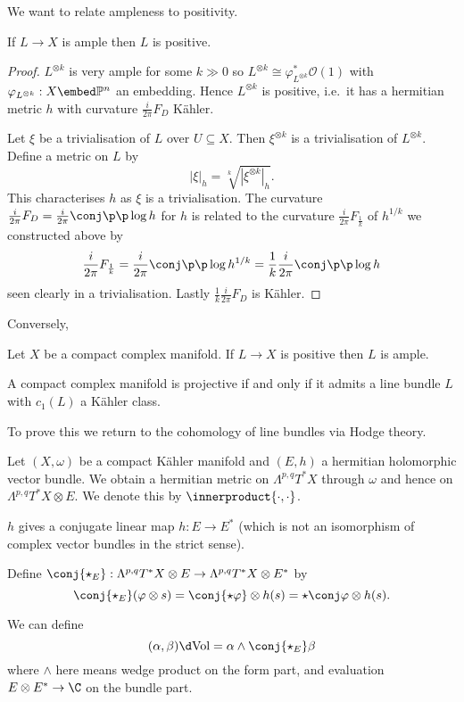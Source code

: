 \documentclass[a4paper]{article}
\renewcommand{\P}{\mathbb P} %
\newcommand{\w}{\wedge} %
\newcommand*{\ip}{\innerproduct}
\begin{document}
We want to relate ampleness to positivity.
\begin{lemma}
  If \(L \to X\) is ample then \(L\) is positive.
\end{lemma}

\begin{proof}
  \(L^{\otimes k}\) is very ample for some \(k \gg 0\) so \(L^{\otimes k} \cong \varphi_{L^{\otimes k}}^* \mathcal O(1)\) with \(\varphi_{L^{\otimes k}}: X \embed \P^n\) an embedding. Hence \(L^{\otimes k}\) is positive, i.e.\ it has a hermitian metric \(h\) with curvature \(\frac{i}{2\pi} F_D\) Kähler.

  Let \(\xi\) be a trivialisation of \(L\) over \(U \subseteq X\). Then \(\xi^{\otimes k}\) is a trivialisation of \(L^{\otimes k}\). Define a metric on \(L\) by
  \[
    |\xi|_h = \sqrt[k]{|\xi^{\otimes k}|_h}.
  \]
  This characterises \(h\) as \(\xi\) is a trivialisation. The curvature \(\frac{i}{2\pi} F_D = \frac{i}{2\pi} \conj \p \p \log h\) for \(h\) is related to the curvature \(\frac{i}{2\pi} F_{\frac{1}{k}}\) of \(h^{1/k}\) we constructed above by
  \[
    \frac{i}{2\pi} F_{\frac{1}{k}}
    = \frac{i}{2\pi} \conj \p \p \log h^{1/k}
    = \frac{1}{k} \frac{i}{2\pi} \conj \p \p \log h
  \]
  seen clearly in a trivialisation. Lastly \(\frac{1}{k} \frac{i}{2\pi} F_D\) is Kähler.
\end{proof}

Conversely,
\begin{theorem}
  Let \(X\) be a compact complex manifold. If \(L \to X\) is positive then \(L\) is ample.
\end{theorem}

\begin{corollary}
  A compact complex manifold is projective if and only if it admits a line bundle \(L\) with \(c_1(L)\) a Kähler class.
\end{corollary}
To prove this we return to the cohomology of line bundles via Hodge theory.

Let \((X, \omega)\) be a compact Kähler manifold and \((E, h)\) a hermitian holomorphic vector bundle. We obtain a hermitian metric on \(\Lambda^{p, q} T^*X\) through \(\omega\) and hence on \(\Lambda^{p, q}T^*X \otimes E\). We denote this by \(\ip{\cdot, \cdot}\).

\(h\) gives a conjugate linear map \(h: E \to E^*\) (which is not an isomorphism of complex vector bundles in the strict sense).

\begin{definition}
  Define \(\conj{\star_E}: \Lambda^{p, q}T^*X \otimes E \to \Lambda^{p, q}T^*X \otimes E^*\) by
  \[
    \conj{\star_E}(\varphi \otimes s)
    = \conj{\star \varphi} \otimes h(s)
    = \star \conj \varphi \otimes h(s).
  \]
\end{definition}
We can define
\[
  (\alpha, \beta) \d \text{Vol} = \alpha \w \conj{\star_E} \beta
\]
where \(\w\) here means wedge product on the form part, and evaluation \(E \otimes E^* \to \C\) on the bundle part.
\end{document}
